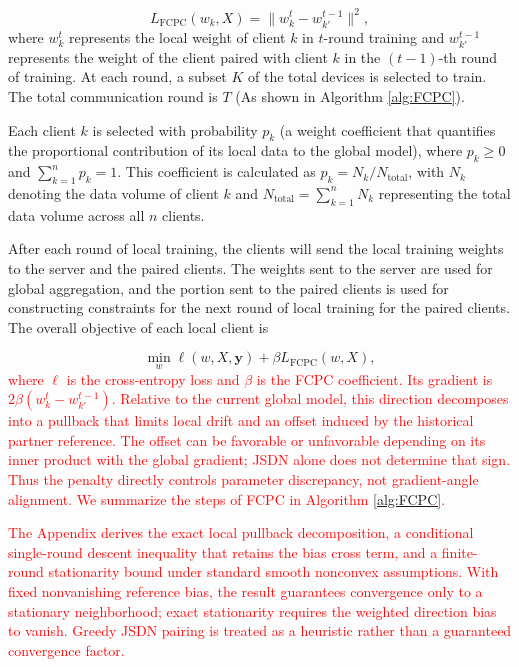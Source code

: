 \documentclass[journal,twoside,web]{ieeecolor}
\newcommand{\rev}[1]{\textcolor{red}{#1}}
\begin{document}
\begin{equation}
L_{\text{FCPC}}(w_k, X) = \|w_k^t- w_{k'}^{t-1}\|^2 ,
\end{equation}
where \( w_k^t \) represents the local weight of client $k$ in $t$-round training and \( w_{k'}^{t-1}\) represents the weight of the client paired with client $k$ in the $(t-1)$-th round of training.
At each round, a subset $K$ of the total devices is selected to train. The total communication round is $T$ (As shown in Algorithm \ref{alg:FCPC}).

Each client $k$ is selected with probability $p_k$ (a weight coefficient that quantifies the proportional contribution of its local data to the global model), where $p_k \geq 0$ and $\sum_{k=1}^n p_k = 1$. This coefficient is calculated as $p_k = N_k / N_{\text{total}}$, with $N_k$ denoting the data volume of client $k$ and $N_{\text{total}} = \sum_{k=1}^n N_k$ representing the total data volume across all $n$ clients.

After each round of local training, the clients will send the local training weights to the server and the paired clients. The weights sent to the server are used for global aggregation, and the portion sent to the paired clients is used for constructing constraints for the next round of local training for the paired clients. The overall objective of each local client is

\begin{equation}
\min_{w} \ell(w, X, \mathbf{y}) + \beta L_{\text{FCPC}}(w, X),
\label{equa:beta}
\end{equation}
\rev{where \(\ell\) is the cross-entropy loss and $\beta$ is the FCPC coefficient. Its gradient is $2\beta(w_k^t-w_{k'}^{t-1})$. Relative to the current global model, this direction decomposes into a pullback that limits local drift and an offset induced by the historical partner reference. The offset can be favorable or unfavorable depending on its inner product with the global gradient; JSDN alone does not determine that sign. Thus the penalty directly controls parameter discrepancy, not gradient-angle alignment. We summarize the steps of FCPC in Algorithm \ref{alg:FCPC}.}

\rev{The Appendix derives the exact local pullback decomposition, a conditional single-round descent inequality that retains the bias cross term, and a finite-round stationarity bound under standard smooth nonconvex assumptions. With fixed nonvanishing reference bias, the result guarantees convergence only to a stationary neighborhood; exact stationarity requires the weighted direction bias to vanish. Greedy JSDN pairing is treated as a heuristic rather than a guaranteed convergence factor.}
\end{document}
